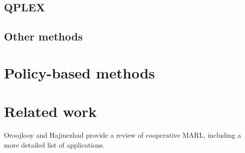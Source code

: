 \subsection{QPLEX}

\subsection{Other methods}

\section{Policy-based methods}
\label{sec:ch3_policy}

\section{Related work}
\label{sec:ch3_rel_work}

Oroojlooy and Hajinezhad \citep{oroojlooy2022review} provide a review of cooperative MARL, including a more detailed list of applications.